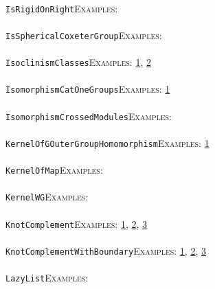 \documentclass[a4paper,11pt]{report}
\begin{document}
{{ \\
 \texttt{IsRigidOnRight}{\nobreakspace}{\nobreakspace}{\nobreakspace}{\nobreakspace}\textsc{Examples:} \\
 \\
 \texttt{IsSphericalCoxeterGroup}{\nobreakspace}{\nobreakspace}{\nobreakspace}{\nobreakspace}\textsc{Examples:} \\
 \\
 \texttt{IsoclinismClasses}{\nobreakspace}{\nobreakspace}{\nobreakspace}{\nobreakspace}\textsc{Examples:} \href{tutorial/chap5.html} {1}{\nobreakspace}, \href{../www/SideLinks/About/aboutBogomolov.html} {2}{\nobreakspace} \\
 \\
 \texttt{IsomorphismCatOneGroups}{\nobreakspace}{\nobreakspace}{\nobreakspace}{\nobreakspace}\textsc{Examples:} \href{../www/SideLinks/About/aboutquasi.html} {1}{\nobreakspace} \\
 \\
 \texttt{IsomorphismCrossedModules}{\nobreakspace}{\nobreakspace}{\nobreakspace}{\nobreakspace}\textsc{Examples:} \\
 \\
 \texttt{KernelOfGOuterGroupHomomorphism}{\nobreakspace}{\nobreakspace}{\nobreakspace}{\nobreakspace}\textsc{Examples:} \href{../www/SideLinks/About/aboutCoefficientSequence.html} {1}{\nobreakspace} \\
 \\
 \texttt{KernelOfMap}{\nobreakspace}{\nobreakspace}{\nobreakspace}{\nobreakspace}\textsc{Examples:} \\
 \\
 \texttt{KernelWG}{\nobreakspace}{\nobreakspace}{\nobreakspace}{\nobreakspace}\textsc{Examples:} \\
 \\
 \texttt{KnotComplement}{\nobreakspace}{\nobreakspace}{\nobreakspace}{\nobreakspace}\textsc{Examples:} \href{tutorial/chap1.html} {1}{\nobreakspace}, \href{tutorial/chap3.html} {2}{\nobreakspace}, \href{../www/SideLinks/About/aboutCoverinSpaces.html} {3}{\nobreakspace} \\
 \\
 \texttt{KnotComplementWithBoundary}{\nobreakspace}{\nobreakspace}{\nobreakspace}{\nobreakspace}\textsc{Examples:} \href{tutorial/chap1.html} {1}{\nobreakspace}, \href{tutorial/chap3.html} {2}{\nobreakspace}, \href{../www/SideLinks/About/aboutCoverinSpaces.html} {3}{\nobreakspace} \\
 \\
 \texttt{LazyList}{\nobreakspace}{\nobreakspace}{\nobreakspace}{\nobreakspace}\textsc{Examples:} \\
}}
\end{document}
